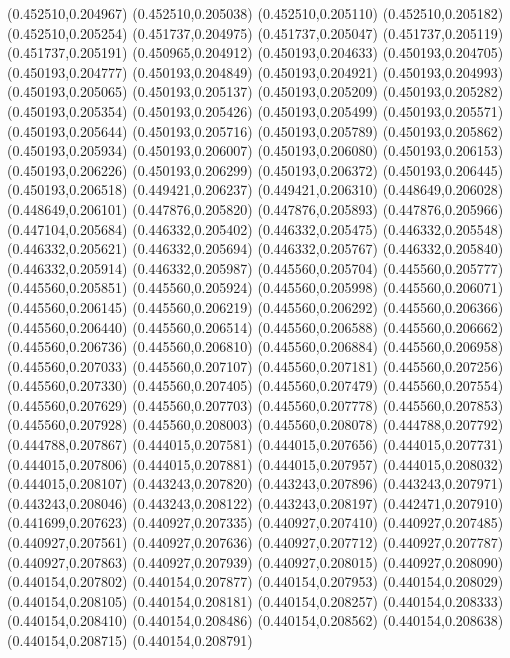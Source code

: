 (0.452510,0.204967)
(0.452510,0.205038)
(0.452510,0.205110)
(0.452510,0.205182)
(0.452510,0.205254)
(0.451737,0.204975)
(0.451737,0.205047)
(0.451737,0.205119)
(0.451737,0.205191)
(0.450965,0.204912)
(0.450193,0.204633)
(0.450193,0.204705)
(0.450193,0.204777)
(0.450193,0.204849)
(0.450193,0.204921)
(0.450193,0.204993)
(0.450193,0.205065)
(0.450193,0.205137)
(0.450193,0.205209)
(0.450193,0.205282)
(0.450193,0.205354)
(0.450193,0.205426)
(0.450193,0.205499)
(0.450193,0.205571)
(0.450193,0.205644)
(0.450193,0.205716)
(0.450193,0.205789)
(0.450193,0.205862)
(0.450193,0.205934)
(0.450193,0.206007)
(0.450193,0.206080)
(0.450193,0.206153)
(0.450193,0.206226)
(0.450193,0.206299)
(0.450193,0.206372)
(0.450193,0.206445)
(0.450193,0.206518)
(0.449421,0.206237)
(0.449421,0.206310)
(0.448649,0.206028)
(0.448649,0.206101)
(0.447876,0.205820)
(0.447876,0.205893)
(0.447876,0.205966)
(0.447104,0.205684)
(0.446332,0.205402)
(0.446332,0.205475)
(0.446332,0.205548)
(0.446332,0.205621)
(0.446332,0.205694)
(0.446332,0.205767)
(0.446332,0.205840)
(0.446332,0.205914)
(0.446332,0.205987)
(0.445560,0.205704)
(0.445560,0.205777)
(0.445560,0.205851)
(0.445560,0.205924)
(0.445560,0.205998)
(0.445560,0.206071)
(0.445560,0.206145)
(0.445560,0.206219)
(0.445560,0.206292)
(0.445560,0.206366)
(0.445560,0.206440)
(0.445560,0.206514)
(0.445560,0.206588)
(0.445560,0.206662)
(0.445560,0.206736)
(0.445560,0.206810)
(0.445560,0.206884)
(0.445560,0.206958)
(0.445560,0.207033)
(0.445560,0.207107)
(0.445560,0.207181)
(0.445560,0.207256)
(0.445560,0.207330)
(0.445560,0.207405)
(0.445560,0.207479)
(0.445560,0.207554)
(0.445560,0.207629)
(0.445560,0.207703)
(0.445560,0.207778)
(0.445560,0.207853)
(0.445560,0.207928)
(0.445560,0.208003)
(0.445560,0.208078)
(0.444788,0.207792)
(0.444788,0.207867)
(0.444015,0.207581)
(0.444015,0.207656)
(0.444015,0.207731)
(0.444015,0.207806)
(0.444015,0.207881)
(0.444015,0.207957)
(0.444015,0.208032)
(0.444015,0.208107)
(0.443243,0.207820)
(0.443243,0.207896)
(0.443243,0.207971)
(0.443243,0.208046)
(0.443243,0.208122)
(0.443243,0.208197)
(0.442471,0.207910)
(0.441699,0.207623)
(0.440927,0.207335)
(0.440927,0.207410)
(0.440927,0.207485)
(0.440927,0.207561)
(0.440927,0.207636)
(0.440927,0.207712)
(0.440927,0.207787)
(0.440927,0.207863)
(0.440927,0.207939)
(0.440927,0.208015)
(0.440927,0.208090)
(0.440154,0.207802)
(0.440154,0.207877)
(0.440154,0.207953)
(0.440154,0.208029)
(0.440154,0.208105)
(0.440154,0.208181)
(0.440154,0.208257)
(0.440154,0.208333)
(0.440154,0.208410)
(0.440154,0.208486)
(0.440154,0.208562)
(0.440154,0.208638)
(0.440154,0.208715)
(0.440154,0.208791)
